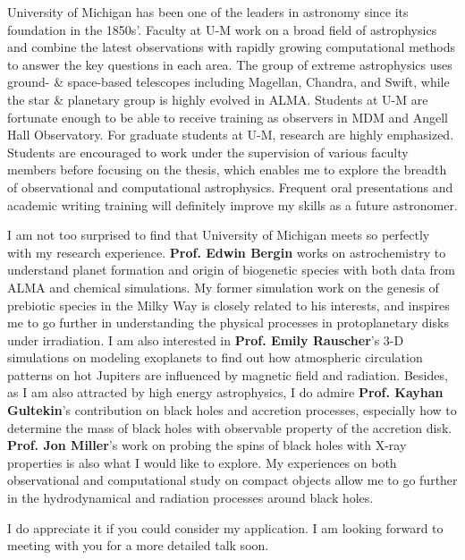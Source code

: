 \documentclass[11pt, a4paper]{awesome-cv} %
\begin{document}
\begin{cvletter}
University of Michigan has been one of the leaders in astronomy since its foundation in the 1850s’. Faculty at U-M work on a broad field of astrophysics and combine the latest observations with rapidly growing computational methods to answer the key questions in each area. The group of extreme astrophysics uses ground- \& space-based telescopes including Magellan, Chandra, and Swift, while the star \& planetary group is highly evolved in ALMA. Students at U-M are fortunate enough to be able to receive training as observers in MDM and Angell Hall Observatory. For graduate students at U-M, research are highly emphasized. Students are encouraged to work under the supervision of various faculty members before focusing on the thesis, which enables me to explore the breadth of observational and computational astrophysics. Frequent oral presentations and academic writing training will definitely improve my skills as a future astronomer.

I am not too surprised to find that University of Michigan meets so perfectly with my research experience. \textbf{Prof. Edwin Bergin} works on astrochemistry to understand planet formation and origin of biogenetic species with both data from ALMA and chemical simulations. My former simulation work on the genesis of prebiotic species in the Milky Way is closely related to his interests, and inspires me to go further in understanding the physical processes in protoplanetary disks under irradiation. I am also interested in \textbf{Prof. Emily Rauscher}’s 3-D simulations on modeling exoplanets to find out how atmospheric circulation patterns on hot Jupiters are influenced by magnetic field and radiation. Besides, as I am also attracted by high energy astrophysics, I do admire \textbf{Prof. Kayhan Gultekin}’s contribution on black holes and accretion processes, especially how to determine the mass of black holes with observable property of the accretion disk. \textbf{Prof. Jon Miller}’s work on probing the spins of black holes with X-ray properties is also what I would like to explore. My experiences on both observational and computational study on compact objects allow me to go further in the hydrodynamical and radiation processes around black holes.

I do appreciate it if you could consider my application. I am looking forward to meeting with you for a more detailed talk soon.

\end{cvletter}


\end{document}

